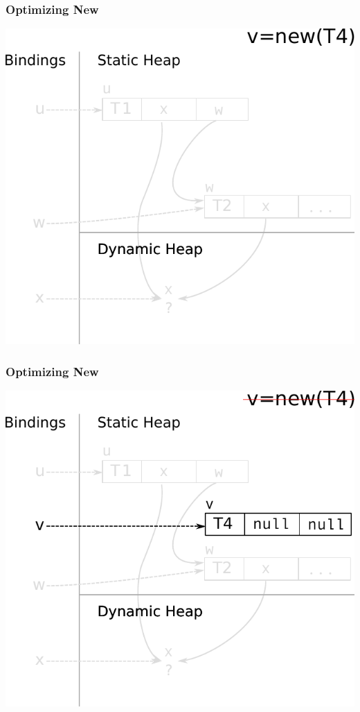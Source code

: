\documentclass[utf8x]{beamer}
\begin{document}
\begin{frame}[plain]
  \frametitle{Optimizing New}
  \includegraphics[scale=0.8]{figures/opt_new1}
\end{frame}

\begin{frame}[plain]
  \frametitle{Optimizing New}
  \includegraphics[scale=0.8]{figures/opt_new2}
\end{frame}
\end{document}

